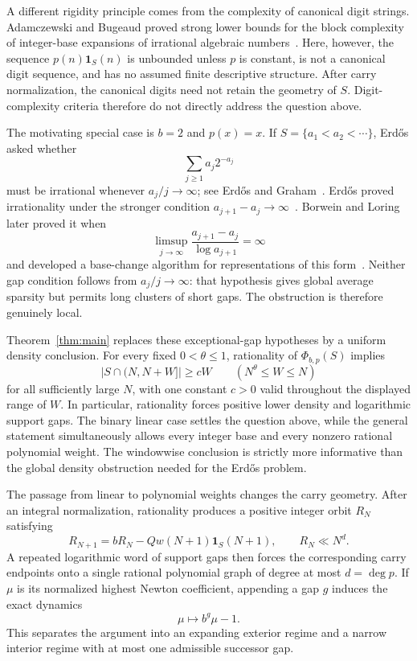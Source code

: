 \documentclass[a4paper,10pt]{amsart}
\theoremstyle{remark}
\begin{document}
A different rigidity principle comes from the complexity of canonical digit
strings. Adamczewski and Bugeaud proved strong lower bounds for the block
complexity of integer-base expansions of irrational algebraic
numbers~\cite{AdamczewskiBugeaud}. Here, however, the sequence
$p(n)\mathbf1_S(n)$ is unbounded unless $p$ is constant, is not a canonical
digit sequence, and has no assumed finite descriptive structure. After carry
normalization, the canonical digits need not retain the geometry of $S$.
Digit-complexity criteria therefore do not directly address the question
above.

The motivating special case is $b=2$ and $p(x)=x$. If
$S=\{a_1<a_2<\cdots\}$, Erd\H{o}s asked whether
\[
 \sum_{j\ge1}a_j2^{-a_j}
\]
must be irrational whenever $a_j/j\to\infty$; see Erd\H{o}s and
Graham~\cite{ErdosGraham}. Erd\H{o}s proved irrationality under the stronger
condition $a_{j+1}-a_j\to\infty$~\cite{Erdos1981}. Borwein and Loring later
proved it when
\[
 \limsup_{j\to\infty}
 \frac{a_{j+1}-a_j}{\log a_{j+1}}=\infty
\]
and developed a base-change algorithm for representations of this
form~\cite{BorweinLoring}. Neither gap condition follows from
$a_j/j\to\infty$: that hypothesis gives global average sparsity but permits
long clusters of short gaps. The obstruction is therefore genuinely local.

Theorem~\ref{thm:main} replaces these exceptional-gap hypotheses by a
uniform density conclusion. For every fixed $0<\theta\le1$, rationality of
$\Phi_{b,p}(S)$ implies
\[
 |S\cap(N,N+W]|\ge cW
 \qquad (N^\theta\le W\le N)
\]
for all sufficiently large $N$, with one constant $c>0$ valid throughout
the displayed range of $W$. In particular, rationality forces positive lower
density and logarithmic support gaps. The binary linear case settles the
question above, while the general statement simultaneously allows every
integer base and every nonzero rational polynomial weight. The windowwise
conclusion is strictly more informative than the global density obstruction
needed for the Erd\H{o}s problem.

The passage from linear to polynomial weights changes the carry geometry.
After an integral normalization, rationality produces a positive integer
orbit $R_N$ satisfying
\[
 R_{N+1}=bR_N-Qw(N+1)\mathbf1_S(N+1),\qquad R_N\ll N^d.
\]
A repeated logarithmic word of support gaps then forces the corresponding
carry endpoints onto a single rational polynomial graph of degree at most
$d=\deg p$. If $\mu$ is its normalized highest Newton coefficient, appending
a gap $g$ induces the exact dynamics
\[
 \mu\longmapsto b^g\mu-1.
\]
This separates the argument into an expanding exterior regime and a narrow
interior regime with at most one admissible successor gap.
\end{document}
